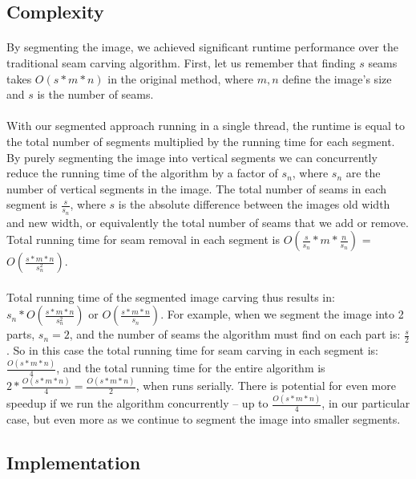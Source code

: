 \documentclass[conference]{acmsiggraph}
\begin{document}
\subsection{Complexity}

\paragraph{}
By segmenting the image, we achieved significant runtime performance over the traditional seam carving algorithm. First, let us remember that finding $s$ seams takes $O(s*m*n)$ in the original method, where $m,n$ define the image's size and $s$ is the number of seams.

\paragraph{}
With our segmented approach running in a single thread, the runtime is equal to the total number of segments multiplied by the running time for each segment. By purely segmenting the image into vertical segments we can concurrently reduce the running time of the algorithm by a factor of $s_n$, where $s_n$ are the number of vertical segments in the image. The total number of seams in each segment is $\frac{s}{s_n}$, where $s$ is the absolute difference between the images old width and new width, or equivalently the total number of seams that we add or remove. Total running time for seam removal in each segment is $O(\frac{s}{s_n} * m * \frac{n}{s_n})$ = $ O(\frac{s*m*n}{s_n^2}) $.  


\paragraph{}
Total running time of the segmented image carving thus results in: $ s_n * O(\frac{ s*m*n }{ s_n^2  })$ or  $O(\frac{ s*m*n  }{ s_n  })$. For example, when we segment the image into 2 parts,  $s_n=2$, and the number of seams the algorithm must find on each part is: $\frac{s}{2}$. So in this case the total running time for seam carving in each segment is: $\frac{O(s*m*n)}{4}$, and the total running time for the entire algorithm is $2 * \frac{O (s*m*n)}{4} = \frac{O(s*m*n)}{2}$, when runs serially.  There is potential for even more speedup if we run the algorithm concurrently -- up to $\frac{O(s*m*n)}{4}$, in our particular case, but even more as we continue to segment the image into smaller segments.



\subsection{Implementation}
\end{document}
